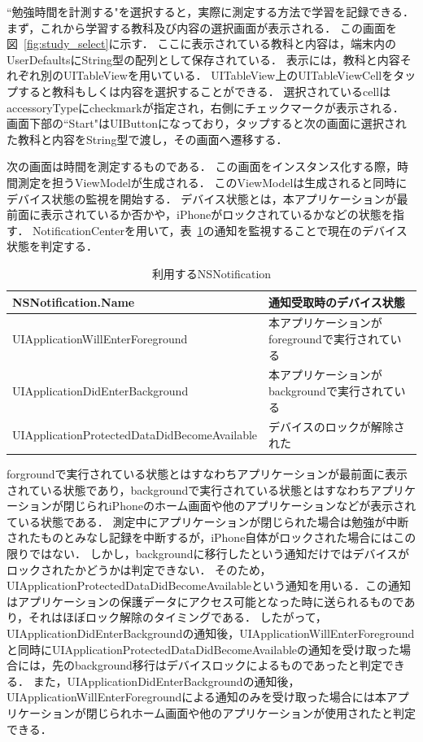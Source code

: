 ``勉強時間を計測する"を選択すると，実際に測定する方法で学習を記録できる．
まず，これから学習する教科及び内容の選択画面が表示される．
この画面を図~\ref{fig:study_select}に示す．
ここに表示されている教科と内容は，端末内のUserDefaultsにString型の配列として保存されている．
表示には，教科と内容それぞれ別のUITableViewを用いている．
UITableView上のUITableViewCellをタップすると教科もしくは内容を選択することができる．
選択されているcellはaccessoryTypeにcheckmarkが指定され，右側にチェックマークが表示される．
画面下部の``Start"はUIButtonになっており，タップすると次の画面に選択された教科と内容をString型で渡し，その画面へ遷移する．

次の画面は時間を測定するものである．
この画面をインスタンス化する際，時間測定を担うViewModelが生成される．
このViewModelは生成されると同時にデバイス状態の監視を開始する．
デバイス状態とは，本アプリケーションが最前面に表示されているか否かや，iPhoneがロックされているかなどの状態を指す．
NotificationCenterを用いて，表~\ref{tb:NSNotification}の通知を監視することで現在のデバイス状態を判定する．

\begin{table}[htb]
\begin{center}
  \begin{tabular}{|l|l|} \hline
    NSNotification.Name & 通知受取時のデバイス状態 \\ \hline
    UIApplicationWillEnterForeground & 本アプリケーションがforegroundで実行されている \\
    UIApplicationDidEnterBackground & 本アプリケーションがbackgroundで実行されている \\
    UIApplicationProtectedDataDidBecomeAvailable & デバイスのロックが解除された \\ \hline
  \end{tabular}
  \caption{利用するNSNotification}
  \label{tb:NSNotification}
\end{center}
\end{table}

forgroundで実行されている状態とはすなわちアプリケーションが最前面に表示されている状態であり，backgroundで実行されている状態とはすなわちアプリケーションが閉じられiPhoneのホーム画面や他のアプリケーションなどが表示されている状態である．
測定中にアプリケーションが閉じられた場合は勉強が中断されたものとみなし記録を中断するが，iPhone自体がロックされた場合にはこの限りではない．
しかし，backgroundに移行したという通知だけではデバイスがロックされたかどうかは判定できない．
そのため，UIApplicationProtectedDataDidBecomeAvailableという通知を用いる．この通知はアプリケーションの保護データにアクセス可能となった時に送られるものであり，それはほぼロック解除のタイミングである．
したがって，UIApplicationDidEnterBackgroundの通知後，UIApplicationWillEnterForegroundと同時にUIApplicationProtectedDataDidBecomeAvailableの通知を受け取った場合には，先のbackground移行はデバイスロックによるものであったと判定できる．
また，UIApplicationDidEnterBackgroundの通知後，UIApplicationWillEnterForegroundによる通知のみを受け取った場合には本アプリケーションが閉じられホーム画面や他のアプリケーションが使用されたと判定できる．

